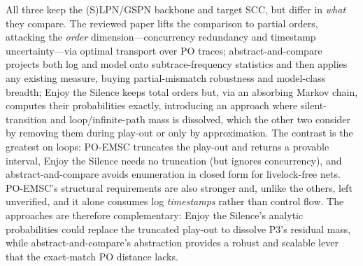 \noindent All three keep the (S)LPN/GSPN backbone and target SCC, but differ in
\emph{what} they compare. The reviewed paper lifts the comparison to partial
orders, attacking the \emph{order} dimension---concurrency redundancy and
timestamp uncertainty---via optimal transport over PO traces; abstract-and-compare
projects both log and model onto subtrace-frequency statistics and then applies
any existing measure, buying partial-mismatch robustness and model-class
breadth; Enjoy the Silence keeps total orders but, via an absorbing Markov
chain, computes their probabilities exactly, introducing an approach where silent-transition
and loop/infinite-path mass is dissolved, which the other two consider by removing them during play-out or only
by approximation. The contrast is the greatest on loops: PO-EMSC truncates the play-out
and returns a provable interval, Enjoy the Silence needs no truncation (but
ignores concurrency), and abstract-and-compare avoids enumeration in closed form
for livelock-free nets. PO-EMSC's structural requirements are also stronger
and, unlike the others, left unverified, and it alone consumes log
\emph{timestamps} rather than control flow. The approaches are therefore
complementary: Enjoy the Silence's analytic probabilities could replace the
truncated play-out to dissolve P3's residual mass, while abstract-and-compare's
abstraction provides a robust and scalable lever that the exact-match PO distance
lacks.
